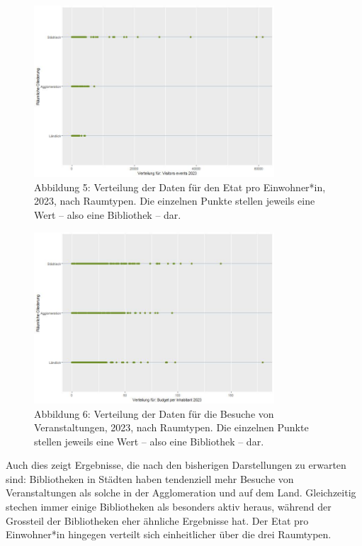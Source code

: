 \documentclass[a4paper,
fontsize=11pt,
oneside,
numbers=noperiodatend,
parskip=half-,
bibliography=totoc,
final
]{scrartcl}
\begin{document}
\begin{figure}
\centering
\includegraphics[angle=90,width=0.8\textwidth]{img/Abbildung05.JPG}
\caption{Abbildung 5: Verteilung der Daten für den Etat pro
Einwohner*in, 2023, nach Raumtypen. Die einzelnen Punkte stellen jeweils
eine Wert -- also eine Bibliothek -- dar.}
\end{figure}

\begin{figure}
\centering
\includegraphics[angle=90,width=0.8\textwidth]{img/Abbildung06.JPG}
\caption{Abbildung 6: Verteilung der Daten für die Besuche von
Veranstaltungen, 2023, nach Raumtypen. Die einzelnen Punkte stellen
jeweils eine Wert -- also eine Bibliothek -- dar.}
\end{figure}

Auch dies zeigt Ergebnisse, die nach den bisherigen Darstellungen zu
erwarten sind: Bibliotheken in Städten haben tendenziell mehr Besuche
von Veranstaltungen als solche in der Agglomeration und auf dem Land.
Gleichzeitig stechen immer einige Bibliotheken als besonders aktiv
heraus, während der Grossteil der Bibliotheken eher ähnliche Ergebnisse
hat. Der Etat pro Einwohner*in hingegen verteilt sich einheitlicher über
die drei Raumtypen.
\end{document}
